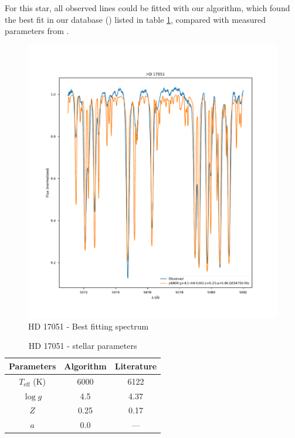 \documentclass{aa}
\begin{document}
For this star, all observed lines could be fitted with our algorithm, which
found the best fit in our database (\cite{laverny_ambre_2012}) listed in table
\ref{tab:star1_params}, compared with measured parameters from \cite{suarez-andres_c/o_2018}.

\begin{figure}[h]
  \centering
  \includegraphics[width=\linewidth]{best_fit_star1.pdf}
  \caption{HD 17051 - Best fitting spectrum}
  \label{fig:star1_best_fit}
\end{figure}


\begin{table}[h]
  \label{tab:star1_params}
  \centering
  \begin{tabular}{c  c  c}
    Parameters & Algorithm & Literature \\
    \midrule
    $T_\text{eff}$ (K) & 6000 & 6122 \\
    $\log g$  & 4.5 & 4.37 \\
    $Z$ & 0.25 & 0.17 \\
    $a$ & 0.0 &  ---
  \end{tabular}
  \caption{HD 17051 - stellar parameters}
\end{table}
\end{document}
